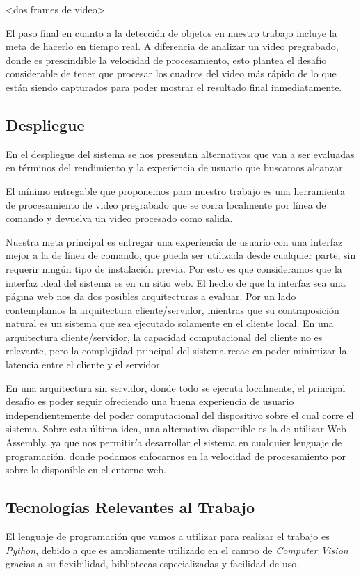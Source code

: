 \documentclass[a4paper]{article}
\begin{document}
<dos frames de video>

El paso final en cuanto a la detección de objetos en nuestro trabajo incluye la meta de hacerlo en tiempo real. A diferencia de analizar un video pregrabado, donde es prescindible la velocidad de procesamiento, esto plantea el desafío considerable de tener que procesar los cuadros del video más rápido de lo que están siendo capturados para poder mostrar el resultado final inmediatamente.

\subsection{Despliegue}
En el despliegue del sistema se nos presentan alternativas que van a ser evaluadas en términos del rendimiento y la experiencia de usuario que buscamos alcanzar.

El mínimo entregable que proponemos para nuestro trabajo es una herramienta de procesamiento de video pregrabado que se corra localmente por línea de comando y devuelva un video procesado como salida.

Nuestra meta principal es entregar una experiencia de usuario con una interfaz mejor a la de línea de comando, que pueda ser utilizada desde cualquier parte, sin requerir ningún tipo de instalación previa. Por esto es que consideramos que la interfaz ideal del sistema es en un sitio web.
El hecho de que la interfaz sea una página web nos da dos posibles arquitecturas a evaluar. Por un lado contemplamos la arquitectura cliente/servidor, mientras que su contraposición natural es un sistema que sea ejecutado solamente en el cliente local.
En una arquitectura cliente/servidor, la capacidad computacional del cliente no es relevante, pero la complejidad principal del sistema recae en poder minimizar la latencia entre el cliente y el servidor.

En una arquitectura sin servidor, donde todo se ejecuta localmente, el principal desafío es poder seguir ofreciendo una buena experiencia de usuario independientemente del poder computacional del dispositivo sobre el cual corre el sistema. Sobre esta última idea, una alternativa disponible es la de utilizar Web Assembly, ya que nos permitiría desarrollar el sistema en cualquier lenguaje de programación, donde podamos enfocarnos en la velocidad de procesamiento por sobre lo disponible en el entorno web.

\subsection{Tecnologías Relevantes al Trabajo}
El lenguaje de programación que vamos a utilizar para realizar el trabajo es \emph{Python}, debido a que es ampliamente utilizado en el campo de \emph{Computer Vision} gracias a su flexibilidad, bibliotecas especializadas y facilidad de uso.
\end{document}
